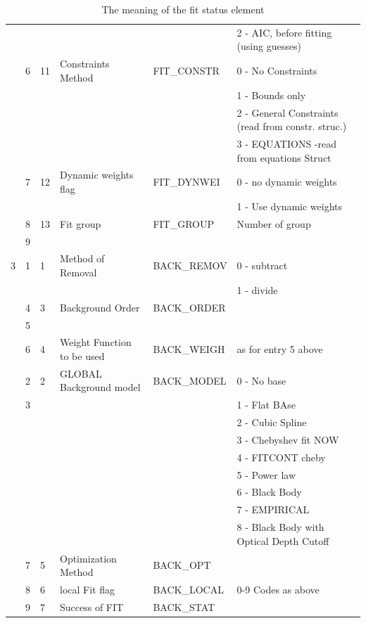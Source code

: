\begin{latexonly}
\begin{table}
\begin{center}
\begin{tabular}{|l|l|l|l|l|l|}
  &   &   &  & &         2 - AIC, before fitting (using guesses)\\ \cline{2-6}
  & 6 & 11 & Constraints Method & FIT\_CONSTR & 0 - No Constraints\\
  &   &   &  & & 1 - Bounds only\\
  &   &   &  & & 2 - General Constraints (read from constr. struc.)\\
  &   &   &  & & 3 - EQUATIONS  -read from equations Struct\\ \cline{2-6}
  & 7 & 12 & Dynamic weights flag & FIT\_DYNWEI & 0 - no dynamic weights\\
  &   &   &  & & 1 - Use dynamic weights\\ \cline{2-6}
  & 8 & 13 & Fit group & FIT\_GROUP & Number of group \\
  & 9 &    & & & \\
\hline
3  & 1 & 1 &Method of Removal & BACK\_REMOV & 0 - subtract \\
  &   &   &                  & & 1 - divide\\
\cline{2-6}
  & 4 & 3 & Background Order & BACK\_ORDER & \\
  & 5 & & & & \\
\cline{2-6}
  & 6 & 4 & Weight Function to be used & BACK\_WEIGH & as for entry 5 above \\
\cline{2-6}
  & 2 & 2 &GLOBAL Background model & BACK\_MODEL & 0 - No base\\
  & 3 &   &                        & & 1 - Flat BAse\\
  &   &   &                        & & 2 - Cubic Spline\\
  &   &   &                        & & 3 - Chebyshev fit NOW\\
  &   &   &                        & & 4 - FITCONT cheby\\
  &   &   &                        & & 5 - Power law\\
  &   &   &                        & & 6 - Black Body\\
  &   &   &                        & & 7 - EMPIRICAL\\
  &   &   &    & & 8 - Black Body with Optical Depth Cutoff\\
\cline{2-6}
 & 7 & 5 & Optimization Method & BACK\_OPT & \\ \cline{2-6}
 & 8 & 6 & local Fit flag & BACK\_LOCAL & 0-9 Codes as above \\ \cline{2-6}
 & 9 & 7 &      Success of FIT & BACK\_STAT & \\
\hline
\end{tabular}
\caption[a]{The meaning of the fit status element}
\label{tb.fitstatus}
\end{center}
\end{table}
\end{latexonly}

